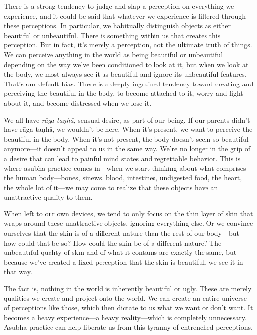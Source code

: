 There is a strong tendency to judge and slap a perception on everything 
we experience, and it could be said that whatever we experience is 
filtered through these perceptions. In particular, we habitually 
distinguish objects as either beautiful or unbeautiful. There is 
something within us that creates this perception. But in fact, it's 
merely a perception, not the ultimate truth of things. We can perceive 
anything in the world as being beautiful or unbeautiful depending on 
the way we've been conditioned to look at it, but when we look at the 
body, we most always see it as beautiful and ignore its unbeautiful 
features. That's our default bias. There is a deeply ingrained tendency 
toward creating and perceiving the beautiful in the body, to become 
attached to it, worry and fight about it, and become distressed when we 
lose it.

We all have \emph{rāga-taṇhā}, sensual desire, as part of our 
being. If our parents didn't have rāga-taṇhā, we wouldn't be here. 
When it's present, we want to perceive the beautiful in the body. When 
it's not present, the body doesn't seem so beautiful anymore---it 
doesn't appeal to us in the same way. We're no longer in the grip of a 
desire that can lead to painful mind states and regrettable behavior. 
This is where asubha practice comes in---when we start thinking about 
what comprises the human body---bones, sinews, blood, intestines, 
undigested food, the heart, the whole lot of it---we may come to 
realize that these objects have an unattractive quality to them.

When left to our own devices, we tend to only focus on the thin layer 
of skin that wraps around these unattractive objects, ignoring 
everything else. Or we convince ourselves that the skin is of a 
different nature than the rest of our body---but how could that be so? 
How could the skin be of a different nature? The unbeautiful quality of 
skin and of what it contains are exactly the same, but because we've 
created a fixed perception that the skin is beautiful, we see it in 
that way.

The fact is, nothing in the world is inherently beautiful or ugly. 
These are merely qualities we create and project onto the world. We can 
create an entire universe of perceptions like those, which then dictate 
to us what we want or don't want. It becomes a heavy experience---a 
heavy reality---which is completely unnecessary. Asubha practice can 
help liberate us from this tyranny of entrenched perceptions.

